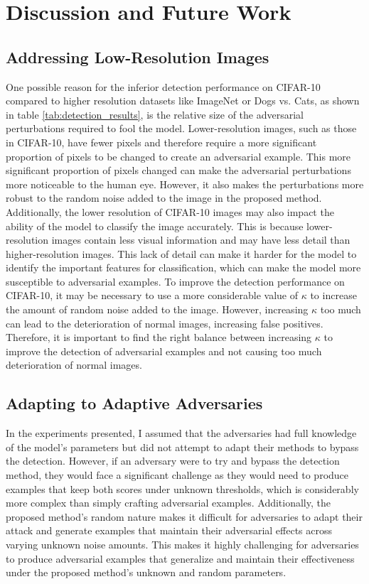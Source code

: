 \chapter{Discussion and Future Work}
\label{discussion}
\overridetextsize

\section{Addressing Low-Resolution Images}

One possible reason for the inferior detection performance on CIFAR-10 compared
to higher resolution datasets like ImageNet or Dogs vs. Cats, as shown in table
\ref{tab:detection_results}, is the relative size of the adversarial
perturbations required to fool the model. Lower-resolution images, such as those
in CIFAR-10, have fewer pixels and therefore require a more significant
proportion of pixels to be changed to create an adversarial example. This more
significant proportion of pixels changed can make the adversarial perturbations
more noticeable to the human eye. However, it also makes the perturbations more
robust to the random noise added to the image in the proposed method.
Additionally, the lower resolution of CIFAR-10 images may also impact the
ability of the model to classify the image accurately. This is because
lower-resolution images contain less visual information and may have less detail
than higher-resolution images. This lack of detail can make it harder for the
model to identify the important features for classification, which can make the
model more susceptible to adversarial examples. To improve the detection
performance on CIFAR-10, it may be necessary to use a more considerable value of
$\kappa$ to increase the amount of random noise added to the image. However,
increasing $\kappa$ too much can lead to the deterioration of normal images,
increasing false positives. Therefore, it is important to find the right balance
between increasing $\kappa$ to improve the detection of adversarial examples and
not causing too much deterioration of normal images.

\clearpage
\section{Adapting to Adaptive Adversaries}

In the experiments presented, I assumed that the adversaries had full knowledge
of the model's parameters but did not attempt to adapt their methods to bypass
the detection. However, if an adversary were to try and bypass the detection
method, they would face a significant challenge as they would need to produce
examples that keep both scores under unknown thresholds, which is considerably
more complex than simply crafting adversarial examples. Additionally, the
proposed method's random nature makes it difficult for adversaries to adapt
their attack and generate examples that maintain their adversarial effects
across varying unknown noise amounts. This makes it highly challenging for
adversaries to produce adversarial examples that generalize and maintain their
effectiveness under the proposed method's unknown and random parameters.

